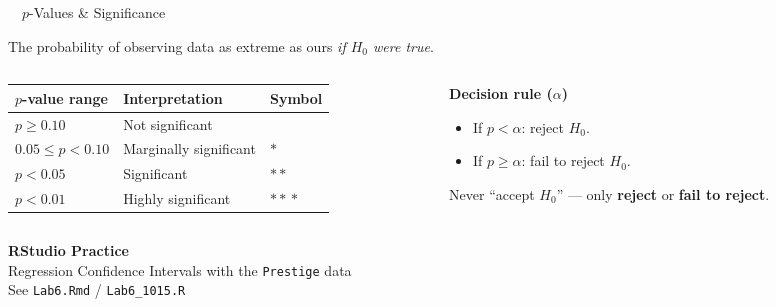 \documentclass[aspectratio=169,11pt]{beamer}
\begin{document}
\begin{frame}{\ \ $p$-Values \& Significance}
  \begin{keybox}[$p$-value]
    The probability of observing data as extreme as ours \emph{if $H_0$ were true}.
  \end{keybox}
  \vspace{0.4em}
  \begin{columns}[T]
    \begin{column}{0.54\textwidth}
      \small
      \renewcommand{\arraystretch}{1.25}
      \begin{tabular}{@{}lll@{}}
        \toprule
        \textbf{$p$-value range} & \textbf{Interpretation} & \textbf{Symbol}\\
        \midrule
        $p \geq 0.10$          & Not significant        &      \\
        $0.05 \leq p < 0.10$   & Marginally significant & $*$  \\
        $p < 0.05$             & Significant            & $**$ \\
        $p < 0.01$             & Highly significant     & $*\!*\!*$\\
        \bottomrule
      \end{tabular}
    \end{column}
    \begin{column}{0.44\textwidth}
      \textbf{\color{qrnavy}Decision rule ($\alpha$)}
      \begin{itemize}
        \item If $p < \alpha$: reject $H_0$.
        \item If $p \geq \alpha$: fail to reject $H_0$.
      \end{itemize}
      \vspace{0.4em}
      \begin{tcolorbox}[colback=qrlight,colframe=qrred,arc=2pt,boxrule=0.6pt]
        Never ``accept $H_0$'' --- only \textbf{reject} or \textbf{fail to reject}.
      \end{tcolorbox}
    \end{column}
  \end{columns}
\end{frame}

{
\begin{frame}
  \vfill
  \centering
  {\color{qrnavy}\Huge\bfseries RStudio Practice}\\[0.8em]
  {\color{qrblue}\large Regression Confidence Intervals with the \texttt{Prestige} data}\\[0.4em]
  {\color{qrgray} See \texttt{Lab6.Rmd} / \texttt{Lab6\_1015.R}}
  \vfill
\end{frame}
}
\end{document}
